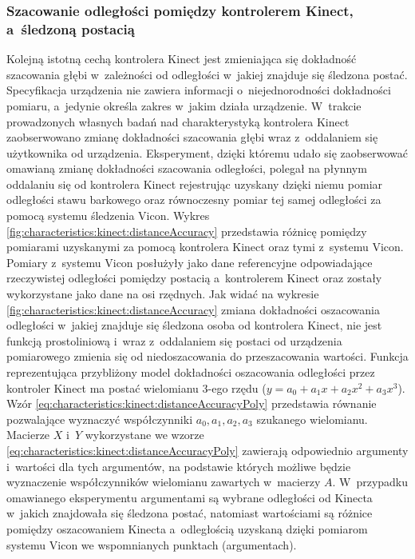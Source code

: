 \subsubsection*{Szacowanie odległości pomiędzy kontrolerem Kinect, a~śledzoną postacią}\label{sssection:distanceEstimation}
Kolejną istotną cechą kontrolera Kinect jest zmieniająca się dokładność szacowania głębi w~zależności od odległości w~jakiej znajduje się śledzona postać. Specyfikacja urządzenia nie zawiera informacji o~niejednorodności dokładności pomiaru, a~jedynie określa zakres w~jakim działa urządzenie. W~trakcie prowadzonych własnych badań nad charakterystyką kontrolera Kinect zaobserwowano zmianę dokładności szacowania głębi wraz z~oddalaniem się użytkownika od urządzenia. Eksperyment, dzięki któremu udało się zaobserwować omawianą zmianę dokładności szacowania odległości, polegał na płynnym oddalaniu się od kontrolera Kinect rejestrując uzyskany dzięki niemu pomiar odległości stawu barkowego oraz równoczesny pomiar tej samej odległości za pomocą systemu śledzenia Vicon. Wykres \ref{fig:characteristics:kinect:distanceAccuracy} przedstawia różnicę pomiędzy pomiarami uzyskanymi za pomocą kontrolera Kinect oraz tymi z~systemu Vicon. Pomiary z~systemu Vicon posłużyły jako dane referencyjne odpowiadające rzeczywistej odległości pomiędzy postacią a~kontrolerem Kinect oraz zostały wykorzystane jako dane na osi rzędnych. Jak widać na wykresie \ref{fig:characteristics:kinect:distanceAccuracy} zmiana dokładności oszacowania odległości w~jakiej znajduje się śledzona osoba od kontrolera Kinect, nie jest funkcją prostoliniową i~wraz z~oddalaniem się postaci od urządzenia pomiarowego zmienia się od niedoszacowania do przeszacowania wartości. Funkcja reprezentująca przybliżony model dokładności oszacowania odległości przez kontroler Kinect ma postać wielomianu 3-ego rzędu ($y = a_0 + a_1x + a_2x^2 + a_3x^3$). Wzór \eqref{eq:characteristics:kinect:distanceAccuracyPoly} przedstawia równanie pozwalające wyznaczyć współczynniki $a_0 ,a_1, a_2, a_3$ szukanego wielomianu. Macierze $X$ i~$Y$ wykorzystane we wzorze \eqref{eq:characteristics:kinect:distanceAccuracyPoly} zawierają odpowiednio argumenty i~wartości dla tych argumentów, na podstawie których możliwe będzie wyznaczenie współczynników wielomianu zawartych w~macierzy $A$. W~przypadku omawianego eksperymentu argumentami są wybrane odległości od Kinecta w~jakich znajdowała się śledzona postać, natomiast wartościami są różnice pomiędzy oszacowaniem Kinecta a~odległością uzyskaną dzięki pomiarom systemu Vicon we wspomnianych punktach (argumentach).
		
